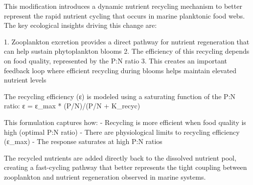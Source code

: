 This modification introduces a dynamic nutrient recycling mechanism to better represent the rapid nutrient cycling that occurs in marine planktonic food webs. The key ecological insights driving this change are:

1. Zooplankton excretion provides a direct pathway for nutrient regeneration that can help sustain phytoplankton blooms
2. The efficiency of this recycling depends on food quality, represented by the P:N ratio
3. This creates an important feedback loop where efficient recycling during blooms helps maintain elevated nutrient levels

The recycling efficiency (ε) is modeled using a saturating function of the P:N ratio:
ε = ε_max * (P/N)/(P/N + K_recyc)

This formulation captures how:
- Recycling is more efficient when food quality is high (optimal P:N ratio)
- There are physiological limits to recycling efficiency (ε_max)
- The response saturates at high P:N ratios

The recycled nutrients are added directly back to the dissolved nutrient pool, creating a fast-cycling pathway that better represents the tight coupling between zooplankton and nutrient regeneration observed in marine systems.
